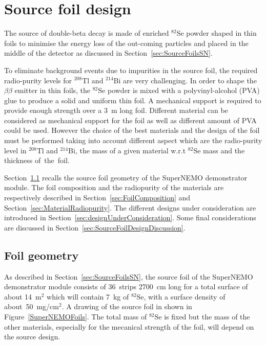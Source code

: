 \documentclass[main.tex]{subfiles}
\begin{document}
 
\bigskip


\section{Source foil design}\label{sec:SourceFoilDesign}


\NI The source of double-beta decay is made of enriched $^{\text{82}}$Se powder shaped in thin foils to minimise the energy loss of the out-coming particles and placed in the middle of the detector as discussed in Section~\ref{sec:SourceFoilsSN}.


\bigskip


\NI To eliminate background events due to impurities in the source foil, the required radio-purity levels for $^{\text{208}}$Tl and $^{\text{214}}$Bi are very challenging. In order to shape the $\beta\beta$ emitter in thin foils, the $^{\text{82}}$Se powder is mixed with a polyvinyl-alcohol (PVA) glue to produce a solid and uniform thin foil. A mechanical support is required to provide enough strength over a 3~m long foil. Different material can be considered as mechanical support for the foil as well as different amount of PVA could be used. However the choice of the best materials and the design of the foil must be performed taking into account different aspect which are the radio-purity level in $^{\text{208}}$Tl and $^{\text{214}}$Bi, the mass of a given material w.r.t $^{\text{82}}$Se mass and the thickness of~the~foil.


\bigskip


\NI Section~\ref{sec:FoilGeometry} recalls the source foil geometry of the SuperNEMO demonstrator module. The foil composition and the radiopurity of the materials are respectively described in Section~\ref{sec:FoilComposition} and Section~\ref{sec:MaterialRadiopurity}. The different designs under consideration are introduced in Section~\ref{sec:designUnderConsideration}. Some final considerations are discussed in Section~\ref{sec:SourceFoilDesignDiscussion}.


\subsection{Foil geometry}\label{sec:FoilGeometry}


\NI As described in Section~\ref{sec:SourceFoilsSN}, the source foil of the SuperNEMO demonstrator module consists of 36~strips 2700~cm long for a total surface of about 14~m$^\text{2}$ which will contain 7~kg of $^{\text{82}}$Se, with a surface density of about~50~mg/cm$^\text{2}$. A drawing of the source foil in shown in Figure~\ref{SuperNEMOFoils}. The total mass of $^{\text{82}}$Se is fixed but the mass of the other materials, especially for the mecanical strength of the foil, will depend on the source design.
\end{document}
